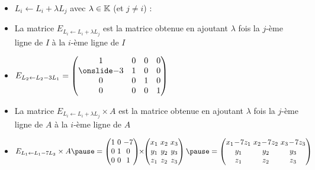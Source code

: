 \begin{frame}
\begin{itemize}\setlength{\itemsep}{8pt}
  \item $L_i \leftarrow L_i+\lambda L_j$ avec $\lambda \in \mathbb{K}$ (et $j\neq i$) :
\pause  
  \item  La matrice $E_{L_i \leftarrow L_i+\lambda L_j}$ est la  matrice
obtenue en ajoutant $\lambda$ fois la $j$-ème ligne de $I$ à la $i$-ème ligne de $I$
\pause

  \item $  E_{L_2 \leftarrow L_2 -3 L_1}=
    \begin{pmatrix}
    1 & 0 & 0 & 0\\
    \mathinsist{-3} & 1 & 0 & 0\\
    0 & 0 & 1 & 0\\
    0 & 0 & 0 & 1
    \end{pmatrix}$
    
\pause    
  \item La matrice $E_{L_i \leftarrow L_i+\lambda L_j} \times A$ est la  matrice obtenue 
  en ajoutant $\lambda$ fois la $j$-ème ligne de $A$ à la $i$-ème ligne de $A$
\pause  
  
  \item {\small $E_{L_1 \leftarrow L_1-7 L_3}  \times A
  \pause
\arraycolsep=1.6pt
= \begin{pmatrix}
  1&0&-7\\0&1&0\\0&0&1  
  \end{pmatrix}
  \!\!\times\!\!
  \begin{pmatrix}
  x_1&x_2&x_3\\y_1&y_2&y_3\\z_1&z_2&z_3  
  \end{pmatrix}
\pause
    =   \begin{pmatrix}
  x_1\!-\!7z_1&x_2\!-\!7z_2&x_3\!-\!7z_3\\ y_1&y_2&y_3\\z_1&z_2&z_3  
  \end{pmatrix}
$
%  
}
\end{itemize}

 
\end{frame}


